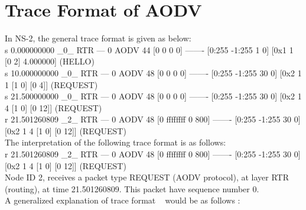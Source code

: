 \documentclass[times,10pt,onecolumn]{article}
\begin{document}
\section{Trace Format of AODV}
\label{sec:trace}

In NS-2, the general trace format is given as below:\\

s 0.000000000 \_0\_ RTR  --- 0 AODV 44 [0 0 0 0] ------- [0:255 -1:255 1 0] [0x1 1 [0 2] 4.000000] (HELLO)\\

s 10.000000000 \_0\_ RTR  --- 0 AODV 48 [0 0 0 0] ------- [0:255 -1:255 30 0] [0x2 1 1 [1 0] [0 4]] (REQUEST)\\

s 21.500000000 \_0\_ RTR  --- 0 AODV 48 [0 0 0 0] ------- [0:255 -1:255 30 0] [0x2 1 4 [1 0] [0 12]] (REQUEST)\\

r 21.501260809 \_2\_ RTR  --- 0 AODV 48 [0 ffffffff 0 800] ------- [0:255 -1:255 30 0] [0x2 1 4 [1 0] [0 12]] (REQUEST)\\

The interpretation of the following trace format is as follows:\\

r 21.501260809 \_2\_ RTR  --- 0 AODV 48 [0 ffffffff 0 800] ------- [0:255 -1:255 30 0] [0x2 1 4 [1 0] [0 12]] (REQUEST)\\

Node ID 2, receives a packet type REQUEST (AODV protocol), at layer RTR (routing), at time 21.501260809. This packet have sequence number 0. \\

A generalized explanation of trace format ~\cite{trace} would be as follows : \\
\end{document}

